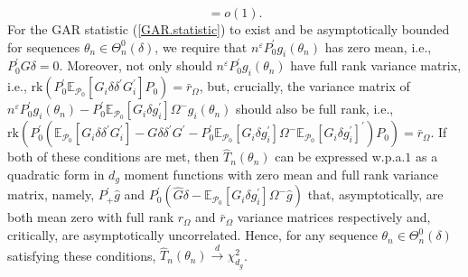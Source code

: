 \documentclass[hidelinks, 11 pt, a4paper, pdflatex]{article}
\begin{document}
{\[      = o(1).
    \]
   For the GAR statistic (\ref{GAR.statistic}) to exist and be asymptotically bounded for sequences $\theta_{n} \in \Theta_{n}^{0}(\delta)$, we require that $n^{\varepsilon}P_{0}^{\prime}g_{i}(\theta_{n})$ has zero mean, i.e., $P_{0}^{\prime}G\delta = 0$. Moreover, not only should $n^{\varepsilon}P_{0}^{\prime}g_{i}(\theta_{n})$ have full rank variance matrix, i.e., $\mathrm{rk}(P_{0}^{\prime} \mathbb{E}_{\mathcal{P}_{0}}[G_{i}\delta\delta^{\prime}G_{i}^{\prime}] P_{0}) = \bar{r}_{\Omega}$, but, crucially, the variance matrix of $n^{\varepsilon}P_{0}^{\prime}g_{i}(\theta_{n}) - P_{0}^{\prime} \mathbb{E}_{\mathcal{P}_0}[G_i \delta g_i^{\prime}] \Omega^{-} g_i(\theta_{n})$ should also be full rank, i.e., $\mathrm{rk}(P_{0}^{\prime}(\mathbb{E}_{\mathcal{P}_{0}}[G_{i}\delta\delta^{\prime}G_{i}^{\prime}] - G\delta \delta^{\prime}G^{\prime} - P_{0}^{\prime} \mathbb{E}_{\mathcal{P}_0}[G_i \delta g_i^{\prime}] \Omega^{-} \mathbb{E}_{\mathcal{P}_0}[G_i \delta g_i^{\prime}]^{\prime}) P_{0}) = \bar{r}_{\Omega}$. If both of these conditions are met, then $\hat{T}_n(\theta_n)$ can be expressed w.p.a.$1$ as a quadratic form in $d_g$ moment functions with zero mean and full rank variance matrix, namely, $P_{+}^{\prime}\hat{g}$ and $P_{0}^{\prime}(\hat{G}\delta -  \mathbb{E}_{\mathcal{P}_0}[G_i \delta g_i^{\prime}] \Omega^{-} \hat{g})$ that, asymptotically, are both mean zero with full rank $r_{\Omega}$ and $\bar{r}_{\Omega}$ variance matrices respectively and, critically, are asymptotically uncorrelated. Hence, for any sequence $\theta_{n} \in \Theta _{n}^{0}(\delta)$ satisfying these conditions, $\hat{T}_n(\theta_n) \overset{d}{\rightarrow} \chi_{d_{g}}^{2}$.

}
\end{document}
